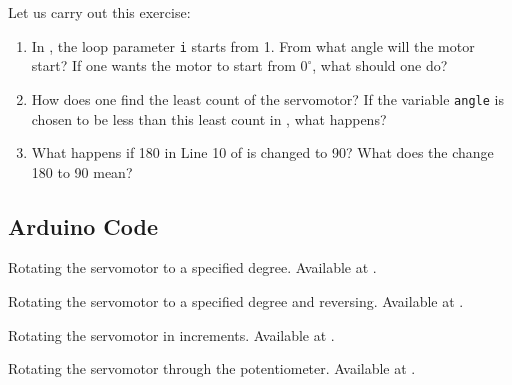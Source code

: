\begin{exercise}
  Let us carry out this exercise:
  \begin{enumerate}
    \item In , the loop parameter {\tt i} starts
          from 1.  From what angle will the motor start?  If one wants the
          motor to start from $0^\circ$, what should one do?
    \item How does one find the least count of the servomotor?  If the
          variable {\tt angle} is chosen to be less than this least count in
          , what happens?
    \item What happens if 180 in Line 10 of  is
          changed to 90?  What does the change 180 to 90 mean?
  \end{enumerate}
\end{exercise}

\subsection{Arduino Code}
\lstset{style=mystyle}
\label{sec:servo-arduino-code}

\begin{ardcode}
   {Rotating
    the servomotor to a specified degree.  Available at
    .}
  \label{ard:servo-init}
  
\end{ardcode}

\begin{ardcode}
   {Rotating
    the servomotor to a specified degree and reversing.  Available at
    .}
  \label{ard:servo-reverse}
  
\end{ardcode}

\begin{ardcode}
   {Rotating the
    servomotor in increments.  Available at
    .}
  \label{ard:servo-loop}
  
\end{ardcode}

\begin{ardcode}
  {Rotating the servomotor through the potentiometer.  Available at
    .}
  \label{ard:servo-pot}
  
\end{ardcode}

